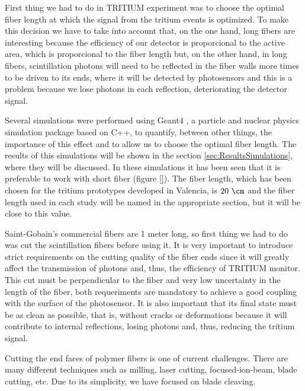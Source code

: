 First thing we had to do in TRITIUM experiment was to choose the optimal fiber length at which the signal from the tritium events is optimized. To make this decision we have to take into account that, on the one hand, long fibers are interesting because the efficiency of our detector is proporcional to the active area, which is proporcional to the fiber length but, on the other hand, in long fibers, scintillation photons will need to be reflected in the fiber walls more times to be driven to its ends, where it will be detected by photosensors and this is a problem because we lose photons in each reflection, deteriorating the detector signal.

Several simulations were performed using Geant4 \cite{Geant4WebPage}, a particle and nuclear physics simulation package based on C++, to quantify, between other things, the importance of this effect and to allow us to choose the optimal fiber length. The results of this simulations will be shown in the section \ref{sec:ResultsSimulations}, where they will be discussed. In these simulations it has been seen that it is preferable to work with short fiber (figure \ref{}). The fiber length, which has been chosen for the tritium prototypes developed in Valencia, is $20~\cm$ and the fiber length used in each study will be named in the appropriate section, but it will be close to this value.

Saint-Gobain's commercial fibers are 1 meter long, so first thing we had to do was cut the scintillation fibers before using it. It is very important to introduce strict requirements on the cutting quality of the fiber ends since it will greatly affect the transmission of photons and, thus, the efficiency of TRITIUM monitor. This cut must be perpendicular to the fiber and very low uncertainty in the length of the fiber, both requeriments are mandatory to achieve a good coupling with the surface of the photosensor. It is also important that its final state must be as clean as possible, that is, without cracks or deformations because it will contribute to internal reflections, losing photons and, thus, reducing the tritium signal.

Cutting the end faces of polymer fibers is one of current challenges. There are many different techniques such as milling, laser cutting, focused-ion-beam, blade cutting, etc. Due to its simplicity, we have focused on blade cleaving. %

